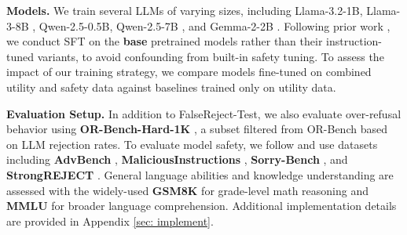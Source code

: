 \documentclass{article} %
\begin{document}
\textbf{Models.} We train several LLMs of varying sizes, including Llama-3.2-1B, Llama-3-8B \citep{grattafiori2024llama}, Qwen-2.5-0.5B, Qwen-2.5-7B \citep{yang2024qwen2}, and Gemma-2-2B \citep{team2024gemma}. Following prior work \citep{brahman2024art, zhang2024backtracking}, we conduct SFT on the \textbf{base} pretrained models rather than their instruction-tuned variants, to avoid confounding from built-in safety tuning. To assess the impact of our training strategy, we compare models fine-tuned on combined utility and safety data against baselines trained only on utility data.

\textbf{Evaluation Setup.} In addition to FalseReject-Test, we also evaluate over-refusal behavior using \textbf{OR-Bench-Hard-1K} \citep{cui2024or}, a subset filtered from OR-Bench based on LLM rejection rates. To evaluate model safety, we follow \cite{zhang2024backtracking} and use datasets including \textbf{AdvBench} \citep{zou2023universal}, \textbf{MaliciousInstructions} \citep{bianchi2023safety}, \textbf{Sorry-Bench} \citep{xie2024sorry}, and \textbf{StrongREJECT} \citep{souly2024strongreject}. General language abilities and knowledge understanding are assessed with the widely-used \textbf{GSM8K} \citep{cobbe2021training} for grade-level math reasoning and \textbf{MMLU} \citep{hendrycks2020measuring} for broader language comprehension. Additional implementation details are provided in Appendix \ref{sec: implement}.
\end{document}

